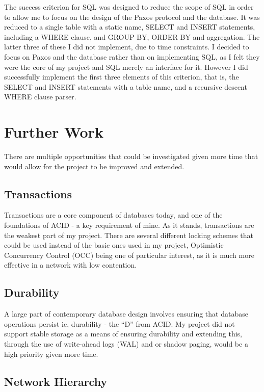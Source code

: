\documentclass[12pt,twoside,notitlepage]{report}
\begin{document}
The success criterion for SQL was designed to reduce the scope of SQL in order to allow me to
focus on the design of the Paxos protocol and the database. It was reduced to a single table with
a static name, SELECT and INSERT statements, including a WHERE clause, and GROUP BY, ORDER BY and
aggregation. The latter three of these I did not implement, due to time constraints. I decided to
focus on Paxos and the database rather than on implementing SQL, as I felt they were the core of
my project and SQL merely an interface for it. However I did successfully implement the first
three elements of this criterion, that is, the SELECT and INSERT statements with a table name, and
a recursive descent WHERE clause parser.

\section{Further Work}

There are multiple opportunities that could be investigated given more time that would allow for
the project to be improved and extended.

\subsection{Transactions}

Transactions are a core component of databases today, and one of the foundations of ACID - a key
requirement of mine. As it stands, transactions are the weakest part of my project. There are
several different locking schemes that could be used instead of the basic ones used in my project,
Optimistic Concurrency Control (OCC) being one of particular interest, as it is much more
effective in a network with low contention.

\subsection{Durability}

A large part of contemporary database design involves ensuring that database operations persist
ie, durability - the ``D'' from ACID. My project did not support stable storage as a means of
ensuring durability and extending this, through the use of write-ahead logs (WAL) and or shadow
paging, would be a high priority given more time.

\subsection{Network Hierarchy}
\end{document}
